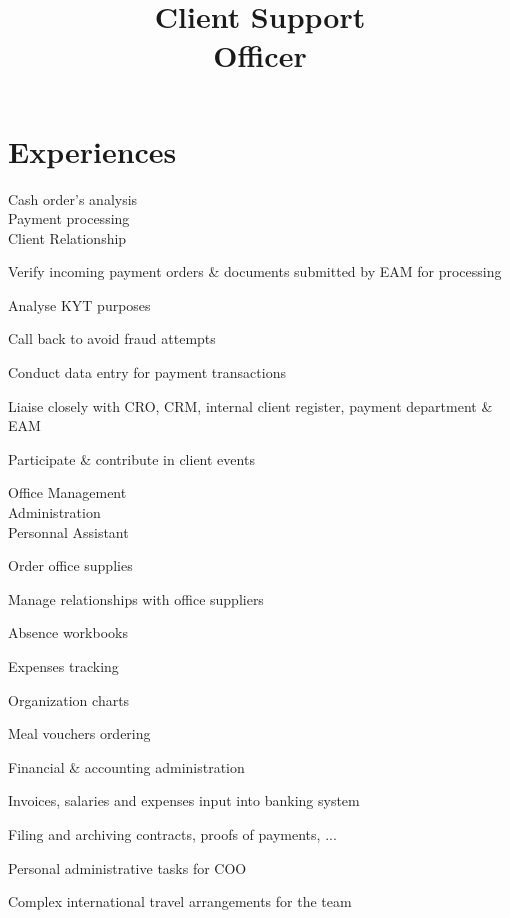 \documentclass[a4paper,11pt]{cv4tw}%
\title{Client Support\\Officer}
\begin{document}



	\section{Experiences}
	{Cash order's analysis\\Payment processing\\Client Relationship}
		{
		\begin{missions}
			\item Verify incoming payment orders \& documents submitted by EAM for processing
			\item Analyse KYT purposes
			\item Call back to avoid fraud attempts
			\item Conduct data entry for payment transactions
			\item Liaise closely with CRO, CRM, internal client register, payment department \& EAM
			\item Participate \& contribute in client events
		\end{missions}
	}

	{Office Management\\Administration\\Personnal Assistant}
		{
		\begin{missions}
			\item Order office supplies
			\item Manage relationships with office suppliers
			\item Absence workbooks
			\item Expenses tracking
			\item Organization charts
			\item Meal vouchers ordering
			\item Financial \& accounting administration
			\item Invoices, salaries and expenses input into banking system
			\item Filing and archiving contracts, proofs of payments, ...
			\item Personal administrative tasks for COO
			\item Complex international travel arrangements for the team
		\end{missions}
	}
\end{document}
